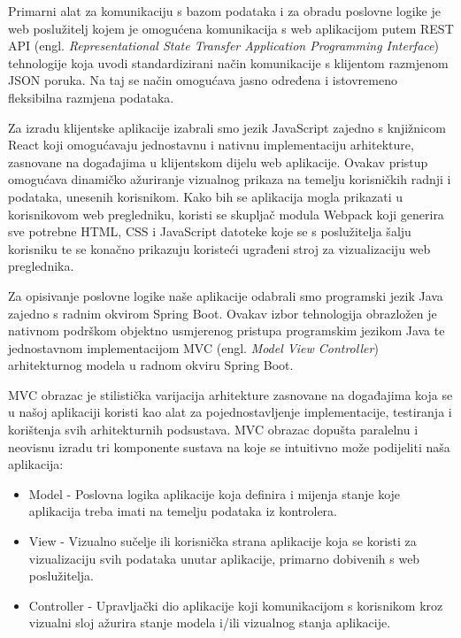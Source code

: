 		Primarni alat za komunikaciju s bazom podataka i za obradu poslovne logike je web poslužitelj kojem je omogućena komunikacija s web aplikacijom putem REST API (engl. \textit{Representational State Transfer Application Programming Interface}) tehnologije koja uvodi standardizirani način
		komunikacije s klijentom razmjenom JSON poruka. Na taj se način omogućava jasno određena i istovremeno fleksibilna razmjena podataka.

		Za izradu klijentske aplikacije izabrali smo jezik JavaScript zajedno s knjižnicom React koji omogućavaju jednostavnu i nativnu implementaciju arhitekture, zasnovane na događajima u klijentskom dijelu web aplikacije. Ovakav pristup omogućava dinamičko ažuriranje vizualnog prikaza na
		temelju korisničkih radnji i podataka, unesenih korisnikom. Kako bih se aplikacija mogla prikazati u korisnikovom web pregledniku, koristi se skupljač modula Webpack koji generira sve potrebne HTML, CSS i JavaScript datoteke koje se s poslužitelja šalju korisniku te se konačno prikazuju
		koristeći ugrađeni stroj za vizualizaciju web preglednika.

		Za opisivanje poslovne logike naše aplikacije odabrali smo programski jezik Java zajedno s radnim okvirom Spring Boot. Ovakav izbor tehnologija obrazložen je nativnom podrškom objektno usmjerenog pristupa programskim jezikom Java te jednostavnom implementacijom MVC 
		(engl. \textit{Model View Controller}) arhitekturnog modela u radnom okviru Spring Boot.

		MVC obrazac je stilistička varijacija arhitekture zasnovane na događajima koja se u našoj aplikaciji koristi kao alat za pojednostavljenje implementacije, testiranja i korištenja svih arhitekturnih podsustava. MVC obrazac dopušta paralelnu i neovisnu izradu tri komponente sustava
		na koje se intuitivno može podijeliti naša aplikacija:
		\begin{itemize}
			\item 	Model - Poslovna logika aplikacije koja definira i mijenja stanje koje aplikacija treba imati na temelju podataka iz kontrolera. 
			\item 	View - Vizualno sučelje ili korisnička strana aplikacije koja se koristi za vizualizaciju svih podataka unutar aplikacije, primarno dobivenih s web poslužitelja.
			\item 	Controller - Upravljački dio aplikacije koji komunikacijom s korisnikom kroz vizualni sloj ažurira stanje modela i/ili vizualnog stanja aplikacije.
		\end{itemize}

